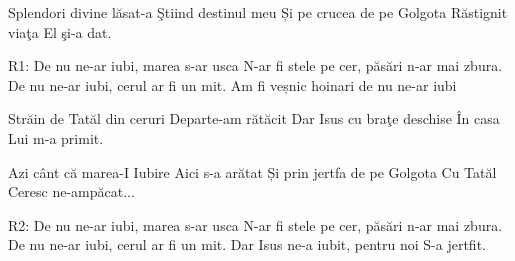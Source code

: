 \beginverse
Splendori divine lăsat-a
Ştiind destinul meu
Și pe crucea de pe Golgota
Răstignit viaţa El şi-a dat.
\endverse

\beginchorus
R1: De nu ne-ar iubi, marea s-ar usca
N-ar fi stele pe cer, păsări n-ar mai zbura.
De nu ne-ar iubi, cerul ar fi un mit.
Am fi veșnic hoinari de nu ne-ar iubi
\endchorus

\beginverse
Străin de Tatăl din ceruri
Departe-am rătăcit
Dar Isus cu braţe deschise
În casa Lui m-a primit.
\endverse

\beginverse
Azi cânt că marea-I Iubire
Aici s-a arătat
Și prin jertfa de pe Golgota
Cu Tatăl Ceresc ne-ampăcat...
\endverse

\beginchorus
R2: De nu ne-ar iubi, marea s-ar usca
N-ar fi stele pe cer, păsări n-ar mai zbura.
De nu ne-ar iubi, cerul ar fi un mit.
Dar Isus ne-a iubit, pentru noi S-a jertfit.
\endchorus
\endsong